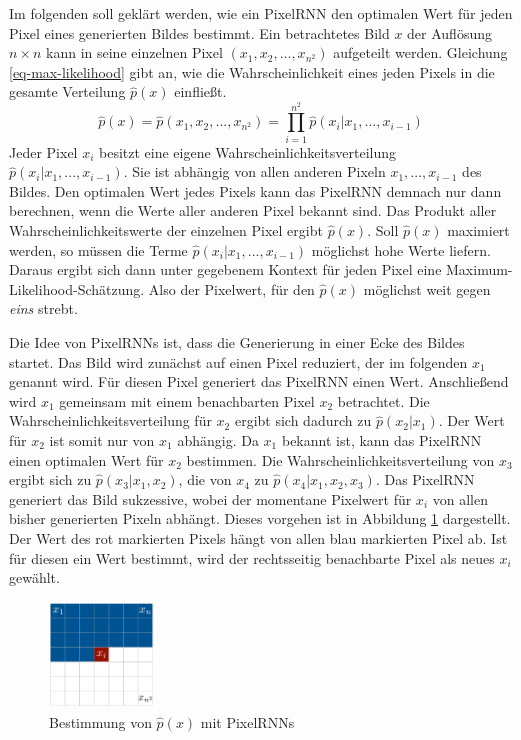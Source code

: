 Im folgenden soll geklärt werden, wie ein \ac{PixelRNN} den optimalen Wert für jeden Pixel eines generierten Bildes bestimmt. Ein betrachtetes Bild $x$ der Auflösung $n \times n$ kann in seine einzelnen Pixel $(x_{1}, x_{2}, ..., x_{n^2})$ aufgeteilt werden. Gleichung \ref{eq-max-likelihood} gibt an, wie die Wahrscheinlichkeit eines jeden Pixels in die gesamte Verteilung $\hat{p}(x)$ einfließt. \cite{pixelRNN}
\begin{equation}
   \label{eq-max-likelihood}
   \hat{p}(x) = \hat{p}(x_{1}, x_{2}, ..., x_{n^2}) = \prod_{i=1}^{n^2}\hat{p}(x_{i}|x_{1},...,x_{i-1})
\end{equation}
Jeder Pixel $x_{i}$ besitzt eine eigene Wahrscheinlichkeitsverteilung $\hat{p}(x_{i}|x_{1},...,x_{i-1})$. Sie ist abhängig von allen anderen Pixeln $x_{1},...,x_{i-1}$ des Bildes. Den optimalen Wert jedes Pixels kann das \ac{PixelRNN} demnach nur dann berechnen, wenn die Werte aller anderen Pixel bekannt sind. Das Produkt aller Wahrscheinlichkeitswerte der einzelnen Pixel ergibt $\hat{p}(x)$. Soll $\hat{p}(x)$ maximiert werden, so müssen die Terme $\hat{p}(x_{i}|x_{1},...,x_{i-1})$ möglichst hohe Werte liefern. Daraus ergibt sich dann unter gegebenem Kontext für jeden Pixel eine Maximum-Likelihood-Schätzung. Also der Pixelwert, für den $\hat{p}(x)$ möglichst weit gegen \emph{eins} strebt. \cite{pixelRNN}

Die Idee von PixelRNNs ist, dass die Generierung in einer Ecke des Bildes startet. Das Bild wird zunächst auf einen Pixel reduziert, der im folgenden $x_{1}$ genannt wird. Für diesen Pixel generiert das \ac{PixelRNN} einen Wert. Anschließend wird $x_{1}$ gemeinsam mit einem benachbarten Pixel $x_{2}$ betrachtet. Die Wahrscheinlichkeitsverteilung für $x_{2}$ ergibt sich dadurch zu $\hat{p}(x_{2}|x_{1})$. Der Wert für $x_2$ ist somit nur von $x_1$ abhängig. Da $x_{1}$ bekannt ist, kann das \ac{PixelRNN} einen optimalen Wert für $x_{2}$ bestimmen. Die Wahrscheinlichkeitsverteilung von $x_{3}$ ergibt sich zu $\hat{p}(x_{3}|x_{1}, x_{2})$, die von $x_{4}$ zu $\hat{p}(x_{4}|x_{1}, x_{2}, x_{3})$. Das \ac{PixelRNN} generiert das Bild sukzessive, wobei der momentane Pixelwert für $x_{i}$ von allen bisher generierten Pixeln abhängt. Dieses vorgehen ist in Abbildung \ref{fig:pixelRNN} dargestellt. Der Wert des rot markierten Pixels hängt von allen blau markierten Pixel ab. Ist für diesen ein Wert bestimmt, wird der rechtsseitig benachbarte Pixel als neues $x_{i}$ gewählt.

\begin{figure}[h]
   \centering
   \includegraphics[width=0.25\textwidth]{images/Generative Networks/PixelRNN.png}
   \caption{Bestimmung von $\hat{p}(x)$ mit PixelRNNs \cite{pixelRNN}}
   \label{fig:pixelRNN}
\end{figure}

